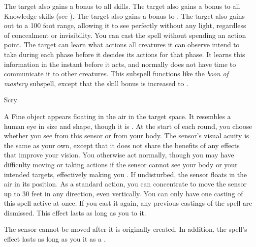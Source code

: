 The target also gains a  bonus to all skills.
The target also gains a  bonus to all Knowledge skills (see ).
The target also gains a  bonus to .
The target also gains  out to a 100 foot range, allowing it to see perfectly without any light, regardless of concealment or invisibility.
You can cast the spell without spending an action point.
The target can learn what actions all creatures it can observe intend to take during each phase before it decides its actions for that phase.
It learns this information in the instant before it acts, and normally does not have time to communicate it to other creatures.
This subspell functions like the \textit{boon of mastery} subspell, except that the skill bonus is increased to .
\begin{spellsection}{Scry}
\begin{spellheader}
\end{spellheader}
\begin{spellcontent}
\begin{spelltargetinginfo}
\end{spelltargetinginfo}
\begin{spelleffects}
\spelleffect
A Fine object appears floating in the air in the target space.
It resembles a human eye in size and shape, though it is .
At the start of each round, you choose whether you see from this sensor or from your body.
The sensor's visual acuity is the same as your own, except that it does not share the benefits of any  effects that improve your vision.
You otherwise act normally, though you may have difficulty moving or taking actions if the sensor cannot see your body or your intended targets, effectively making you \blinded.
If undisturbed, the sensor floats in the air in its position.
As a standard action, you can concentrate to move the sensor up to 30 feet in any direction, even vertically.
You can only have one casting of this spell active at once.
If you cast it again, any previous castings of the spell are dismissed.
This effect lasts as long as you  to it.
\end{spelleffects}
\end{spellcontent}
\begin{spellfooter}
\end{spellfooter}
\begin{spellsubcontent}
\begin{spellcantrip}
The sensor cannot be moved after it is originally created.
In addition, the spell's effect lasts as long as you  it as a .
\end{spellcantrip}
\end{spellsubcontent}
\end{spellsection}

